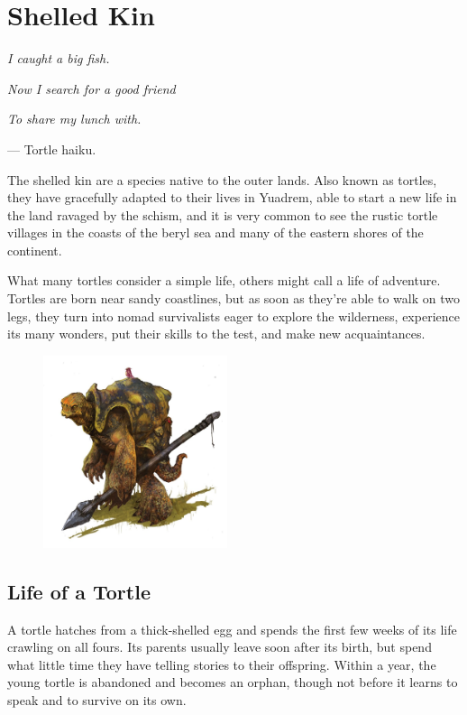 
\section{Shelled Kin}
\begin{linenumbers}
\textit{I caught a big fish.}

\textit{Now I search for a good friend}

\textit{To share my lunch with.}

\hspace*{\fill} --- Tortle haiku.

The shelled kin are a species native to the outer lands.
Also known as tortles, they have gracefully adapted to their lives in Yuadrem, able to start a new life in the land ravaged by the schism, and it is very common to see the rustic tortle villages in the coasts of the beryl sea and many of the eastern shores of the continent.

What many tortles consider a simple life, others might call a life of adventure.
Tortles are born near sandy coastlines, but as soon as they're able to walk on two legs, they turn into nomad survivalists eager to explore the wilderness, experience its many wonders, put their skills to the test, and make new acquaintances.

\begin{figure}[!b]
    \centering
    \includegraphics[width=0.48\textwidth]{02kins/img/17tortle_official.jpg}
\end{figure}

\subsection*{Life of a Tortle}
A tortle hatches from a thick-shelled egg and spends the first few weeks of its life crawling on all fours.
Its parents usually leave soon after its birth, but spend what little time they have telling stories to their offspring.
Within a year, the young tortle is abandoned and becomes an orphan, though not before it learns to speak and to survive on its own.


\end{linenumbers}
